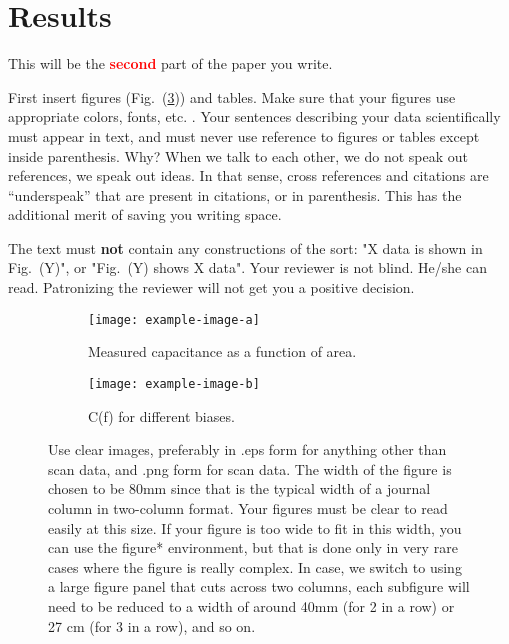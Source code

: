 \documentclass[12pt,twocolumn]{article}
\begin{document}
\section{Results}
\label{sec:results}

This will be the \textbf{\Huge \textcolor{red}{second}} part of the paper you write.

First insert figures (Fig.~(\ref{fig:cv})) and tables. Make sure that your figures use appropriate colors, fonts, etc. \cite{mcnames:2006}. Your sentences describing your data scientifically must appear in text, and must never use reference to figures or tables except inside parenthesis. Why? When we talk to each other, we do not speak out references, we speak out ideas. In that sense, cross references and citations are ``underspeak'' that are present in citations, or in parenthesis. This has the additional merit of saving you writing space.

The text must \textbf{not} contain any constructions of the sort: "X data is shown in Fig.~(Y)", or "Fig.~(Y) shows X data". Your reviewer is not blind. He/she can read. Patronizing the reviewer will not get you a positive decision.


\begin{figure}
  \centering
  \begin{subfigure}{80mm}
    \centering
    \texttt{[image: example-image-a]}
    \caption{Measured capacitance as a function of area.}
    \label{fig:ca}
  \end{subfigure}
  \hfill
  \begin{subfigure}{80mm}
    \centering
    \texttt{[image: example-image-b]}
    \caption{C(f) for different biases.}
    \label{fig:cfv}
  \end{subfigure}
  \caption{ Use clear images, preferably in .eps form for anything other than scan data, and  .png form for scan data. The width of the figure is chosen to be 80mm since that is the typical width of a journal column in two-column format. Your figures must be clear to read easily at this size. If your figure is too wide to fit in this width, you can use the figure* environment, but that is done only in very rare cases where the figure is really complex. In case, we switch to using a large figure panel that cuts across two columns, each subfigure will need to be reduced to a width of around 40mm (for 2 in a row) or 27 cm (for 3 in a row), and so on.}
  \label{fig:cv}
\end{figure}
\end{document}

